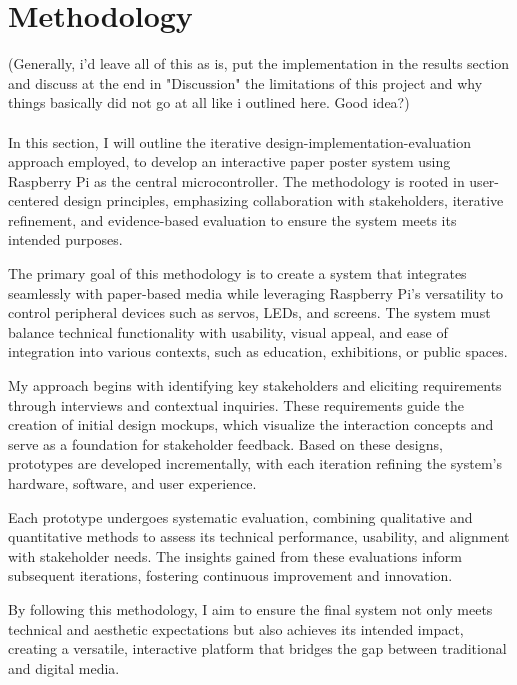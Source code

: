 \chapter{Methodology}
\label{sec:Methodology}

(Generally, i'd leave all of this as is, put the implementation in the results section and discuss at the end in "Discussion" the limitations of this project and why things basically did not go at all like i outlined here. Good idea?)\\\\

In this section, I will outline the iterative design-implementation-evaluation approach employed, to develop an interactive paper poster system using Raspberry Pi as the central microcontroller. The methodology is rooted in user-centered design principles, emphasizing collaboration with stakeholders, iterative refinement, and evidence-based evaluation to ensure the system meets its intended purposes.

The primary goal of this methodology is to create a system that integrates seamlessly with paper-based media while leveraging Raspberry Pi's versatility to control peripheral devices such as servos, LEDs, and screens. The system must balance technical functionality with usability, visual appeal, and ease of integration into various contexts, such as education, exhibitions, or public spaces.

My approach begins with identifying key stakeholders and eliciting requirements through interviews and contextual inquiries. These requirements guide the creation of initial design mockups, which visualize the interaction concepts and serve as a foundation for stakeholder feedback. Based on these designs, prototypes are developed incrementally, with each iteration refining the system's hardware, software, and user experience.

Each prototype undergoes systematic evaluation, combining qualitative and quantitative methods to assess its technical performance, usability, and alignment with stakeholder needs. The insights gained from these evaluations inform subsequent iterations, fostering continuous improvement and innovation.

By following this methodology, I aim to ensure the final system not only meets technical and aesthetic expectations but also achieves its intended impact, creating a versatile, interactive platform that bridges the gap between traditional and digital media.

